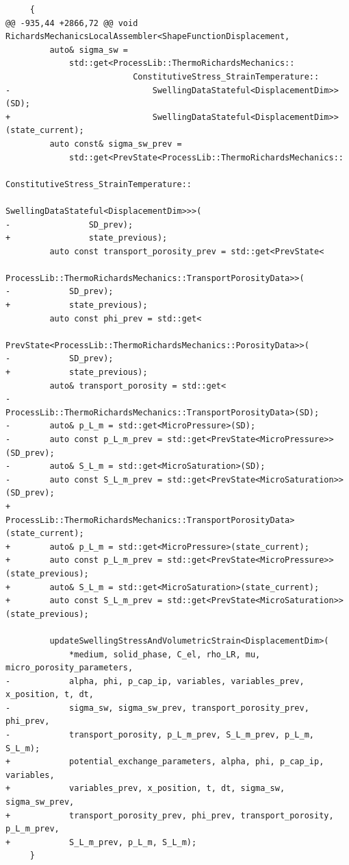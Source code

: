 \documentclass[10pt]{article}
\begin{document}
\begin{lstlisting}
     {
@@ -935,44 +2866,72 @@ void RichardsMechanicsLocalAssembler<ShapeFunctionDisplacement,
         auto& sigma_sw =
             std::get<ProcessLib::ThermoRichardsMechanics::
                          ConstitutiveStress_StrainTemperature::
-                             SwellingDataStateful<DisplacementDim>>(SD);
+                             SwellingDataStateful<DisplacementDim>>(state_current);
         auto const& sigma_sw_prev =
             std::get<PrevState<ProcessLib::ThermoRichardsMechanics::
                                    ConstitutiveStress_StrainTemperature::
                                        SwellingDataStateful<DisplacementDim>>>(
-                SD_prev);
+                state_previous);
         auto const transport_porosity_prev = std::get<PrevState<
             ProcessLib::ThermoRichardsMechanics::TransportPorosityData>>(
-            SD_prev);
+            state_previous);
         auto const phi_prev = std::get<
             PrevState<ProcessLib::ThermoRichardsMechanics::PorosityData>>(
-            SD_prev);
+            state_previous);
         auto& transport_porosity = std::get<
-            ProcessLib::ThermoRichardsMechanics::TransportPorosityData>(SD);
-        auto& p_L_m = std::get<MicroPressure>(SD);
-        auto const p_L_m_prev = std::get<PrevState<MicroPressure>>(SD_prev);
-        auto& S_L_m = std::get<MicroSaturation>(SD);
-        auto const S_L_m_prev = std::get<PrevState<MicroSaturation>>(SD_prev);
+            ProcessLib::ThermoRichardsMechanics::TransportPorosityData>(state_current);
+        auto& p_L_m = std::get<MicroPressure>(state_current);
+        auto const p_L_m_prev = std::get<PrevState<MicroPressure>>(state_previous);
+        auto& S_L_m = std::get<MicroSaturation>(state_current);
+        auto const S_L_m_prev = std::get<PrevState<MicroSaturation>>(state_previous);
 
         updateSwellingStressAndVolumetricStrain<DisplacementDim>(
             *medium, solid_phase, C_el, rho_LR, mu, micro_porosity_parameters,
-            alpha, phi, p_cap_ip, variables, variables_prev, x_position, t, dt,
-            sigma_sw, sigma_sw_prev, transport_porosity_prev, phi_prev,
-            transport_porosity, p_L_m_prev, S_L_m_prev, p_L_m, S_L_m);
+            potential_exchange_parameters, alpha, phi, p_cap_ip, variables,
+            variables_prev, x_position, t, dt, sigma_sw, sigma_sw_prev,
+            transport_porosity_prev, phi_prev, transport_porosity, p_L_m_prev,
+            S_L_m_prev, p_L_m, S_L_m);
     }
 

\end{lstlisting}
\end{document}
